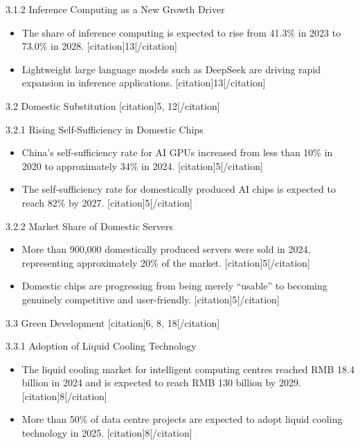 \documentclass{huawei}
\begin{document}
\begin{tcolorbox}[
    title={Example of Hierarchical Research Outline},
    colback=gray!5,
    colframe=gray!40,
    fonttitle=\bfseries,
    boxrule=0.5pt,
    arc=2pt,
    breakable
]
\textcolor{TitleRed}{3.1.2 Inference Computing as a New Growth Driver}
\begin{itemize}[leftmargin=1em, listparindent=\parindent]
\item The share of inference computing is expected to rise from 41.3\% in 2023 to 73.0\% in 2028. [citation]13[/citation]
\item Lightweight large language models such as DeepSeek are driving rapid expansion in inference applications. [citation]13[/citation]
\end{itemize}

\textcolor{TitleRed}{3.2 Domestic Substitution [citation]5, 12[/citation]}

\textcolor{TitleRed}{3.2.1 Rising Self-Sufficiency in Domestic Chips}
\begin{itemize}[leftmargin=1em, listparindent=\parindent]
\item China’s self-sufficiency rate for AI GPUs increased from less than 10\% in 2020 to approximately 34\% in 2024. [citation]5[/citation]
\item The self-sufficiency rate for domestically produced AI chips is expected to reach 82\% by 2027. [citation]5[/citation]
\end{itemize}

\textcolor{TitleRed}{3.2.2 Market Share of Domestic Servers}
\begin{itemize}[leftmargin=1em, listparindent=\parindent]
\item More than 900,000 domestically produced servers were sold in 2024, representing approximately 20\% of the market. [citation]5[/citation]
\item Domestic chips are progressing from being merely “usable” to becoming genuinely competitive and user-friendly. [citation]5[/citation]
\end{itemize}

\textcolor{TitleRed}{3.3 Green Development [citation]6, 8, 18[/citation]}

\textcolor{TitleRed}{3.3.1 Adoption of Liquid Cooling Technology}
\begin{itemize}[leftmargin=1em, listparindent=\parindent]
\item The liquid cooling market for intelligent computing centres reached RMB 18.4 billion in 2024 and is expected to reach RMB 130 billion by 2029. [citation]8[/citation]
\item More than 50\% of data centre projects are expected to adopt liquid cooling technology in 2025. [citation]8[/citation]
\end{itemize}


\end{tcolorbox}
\end{document}
